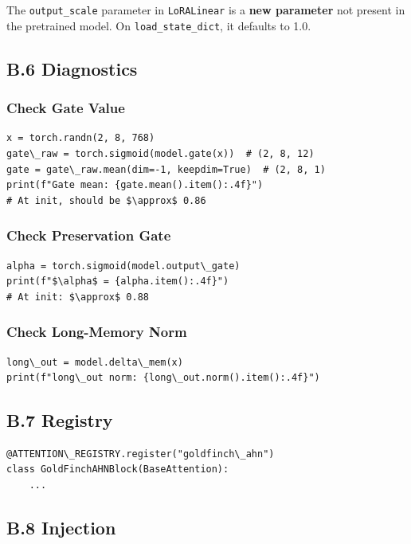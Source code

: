 The \texttt{output\_scale} parameter in \texttt{LoRALinear} is a \textbf{new parameter} not 
present in the pretrained model. On \texttt{load\_state\_dict}, it defaults to 1.0.

\subsection{B.6 Diagnostics}

\subsubsection{Check Gate Value}

\begin{lstlisting}
x = torch.randn(2, 8, 768)
gate\_raw = torch.sigmoid(model.gate(x))  # (2, 8, 12)
gate = gate\_raw.mean(dim=-1, keepdim=True)  # (2, 8, 1)
print(f"Gate mean: {gate.mean().item():.4f}")
# At init, should be $\approx$ 0.86
\end{lstlisting}

\subsubsection{Check Preservation Gate}

\begin{lstlisting}
alpha = torch.sigmoid(model.output\_gate)
print(f"$\alpha$ = {alpha.item():.4f}")
# At init: $\approx$ 0.88
\end{lstlisting}

\subsubsection{Check Long-Memory Norm}

\begin{lstlisting}
long\_out = model.delta\_mem(x)
print(f"long\_out norm: {long\_out.norm().item():.4f}")
\end{lstlisting}

\subsection{B.7 Registry}

\begin{lstlisting}
@ATTENTION\_REGISTRY.register("goldfinch\_ahn")
class GoldFinchAHNBlock(BaseAttention):
    ...
\end{lstlisting}

\subsection{B.8 Injection}

